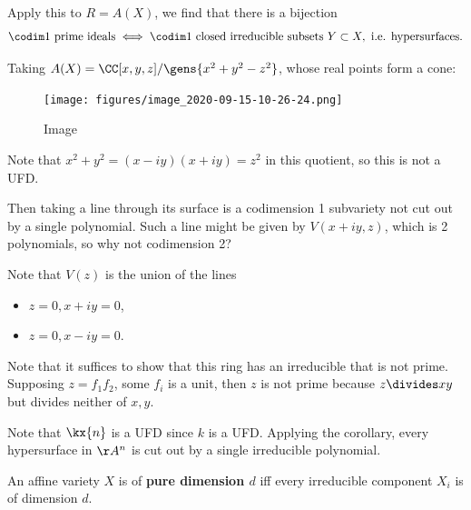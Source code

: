 \begin{example}

Apply this to \(R=A(X)\), we find that there is a bijection
\begin{align*}  
\codim 1 \text{ prime ideals}
\iff 
\codim 1 \text{ closed irreducible subsets }Y\subset X,\text{ i.e. hypersurfaces}
.\end{align*}

Taking \(A(X) = \CC[x,y,z]/\gens{x^2+y^2-z^2}\), whose real points form
a cone:

\begin{figure}
\centering
\texttt{[image: figures/image\_2020-09-15-10-26-24.png]}
\caption{Image}
\end{figure}

Note that \(x^2 + y^2 = (x-iy)(x+iy) = z^2\) in this quotient, so this
is not a UFD.

Then taking a line through its surface is a codimension 1 subvariety not
cut out by a single polynomial. Such a line might be given by
\(V(x + iy, z)\), which is 2 polynomials, so why not codimension 2?

Note that \(V(z)\) is the union of the lines

\begin{itemize}
\tightlist
\item
  \(z = 0, x + iy= 0\),
\item
  \(z=0, x - iy = 0\).
\end{itemize}

Note that it suffices to show that this ring has an irreducible that is
not prime. Supposing \(z = f_1 f_2\), some \(f_i\) is a unit, then \(z\)
is not prime because \(z\divides xy\) but divides neither of \(x,y\).

\end{example}

\begin{example}

Note that \(\kx{n}\) is a UFD since \(k\) is a UFD. Applying the
corollary, every hypersurface in \(\AA^n\) is cut out by a single
irreducible polynomial.

\end{example}

\begin{definition}[?]

An affine variety \(X\) is of \textbf{pure dimension \(d\)} iff every
irreducible component \(X_i\) is of dimension \(d\).

\end{definition}

